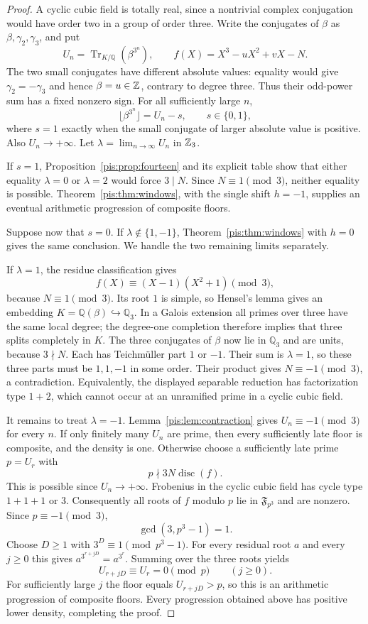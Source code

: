 \documentclass[11pt,a4paper]{article}
\theoremstyle{definition}\newtheorem{definition}[theorem]{Definition}
\theoremstyle{remark}\newtheorem{remark}[theorem]{Remark}
\newcommand{\F}{\mathfrak F}\newcommand{\FF}{\mathbb F}
\newcommand{\Q}{\mathbb Q}\newcommand{\R}{\mathbb R}
\newcommand{\Tr}{\operatorname{Tr}}\newcommand{\Nm}{\operatorname{N}}
\begin{document}
\begin{proof}
A cyclic cubic field is totally real, since a nontrivial complex
conjugation would have order two in a group of order three. Write
the conjugates of $\beta$ as $\beta,\gamma_2,\gamma_3$, and put
\[
 U_n=\Tr_{K/\Q}(\beta^{3^n}),\qquad
 f(X)=X^3-uX^2+vX-N.
\]
The two small conjugates have different absolute values: equality
would give $\gamma_2=-\gamma_3$ and hence $\beta=u\in\mathbb Z$,
contrary to degree three. Thus their odd-power sum has a fixed
nonzero sign. For all sufficiently large $n$,
\[
 \lfloor\beta^{3^n}\rfloor=U_n-s,
 \qquad s\in\{0,1\},
\]
where $s=1$ exactly when the small conjugate of larger absolute
value is positive. Also $U_n\to+\infty$.
Let $\lambda=\lim_{n\to\infty}U_n$ in $\mathbb Z_3$.

If $s=1$, Proposition~\ref{pis:prop:fourteen} and its explicit table
show that either equality $\lambda=0$ or $\lambda=2$ would force
$3\mid N$. Since $N\equiv1\pmod3$, neither equality is possible.
Theorem~\ref{pis:thm:windows}, with the single shift $h=-1$, supplies
an eventual arithmetic progression of composite floors.

Suppose now that $s=0$. If $\lambda\notin\{1,-1\}$,
Theorem~\ref{pis:thm:windows} with $h=0$ gives the same conclusion.
We handle the two remaining limits separately.

If $\lambda=1$, the residue classification gives
\[
 f(X)\equiv(X-1)(X^2+1)\pmod3,
\]
because $N\equiv1\pmod3$. Its root $1$ is simple, so Hensel's
lemma gives an embedding $K=\Q(\beta)\hookrightarrow\Q_3$.
In a Galois extension all primes over three have the same local
degree; the degree-one completion therefore implies that three
splits completely in $K$. The three conjugates of $\beta$ now lie
in $\Q_3$ and are units, because $3\nmid N$. Each has
Teichm\"uller part $1$ or $-1$. Their sum is $\lambda=1$, so
these three parts must be $1,1,-1$ in some order. Their product
gives $N\equiv-1\pmod3$, a contradiction. Equivalently, the
displayed separable reduction has factorization type $1+2$,
which cannot occur at an unramified prime in a cyclic cubic field.

It remains to treat $\lambda=-1$. Lemma~\ref{pis:lem:contraction}
gives $U_n\equiv-1\pmod3$ for every $n$. If only finitely many
$U_n$ are prime, then every sufficiently late floor is composite,
and the density is one. Otherwise choose a sufficiently late
prime $p=U_r$ with
\[
 p\nmid3N\operatorname{disc}(f).
\]
This is possible since $U_n\to+\infty$. Frobenius in the cyclic
cubic field has cycle type $1+1+1$ or $3$. Consequently all roots
of $f$ modulo $p$ lie in $\F_{p^3}$ and are nonzero. Since
$p\equiv-1\pmod3$,
\[
 \gcd(3,p^3-1)=1.
\]
Choose $D\ge1$ with $3^D\equiv1\pmod{p^3-1}$. For every
residual root $a$ and every $j\ge0$ this gives
$a^{3^{r+jD}}=a^{3^r}$. Summing over the three roots yields
\[
 U_{r+jD}\equiv U_r=0\pmod p\qquad(j\ge0).
\]
For sufficiently large $j$ the floor equals $U_{r+jD}>p$, so
this is an arithmetic progression of composite floors. Every
progression obtained above has positive lower density, completing
the proof.
\end{proof}
\end{document}
